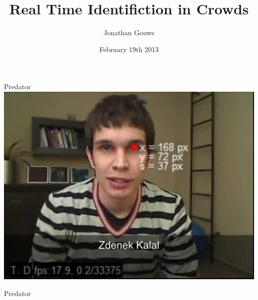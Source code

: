 \documentclass[mathserif]{beamer}
\title{Real Time Identifiction in Crowds}
\subtitle{}
\author[Gouws]{Jonathan Gouws}
\institute[RU]{Rhodes University}
\date{February 19th 2013}
\begin{document}
\begin{frame}
   \maketitle
\end{frame}

\begin{frame}{Predator\cite{PredatorVid}}
\centering
  \includegraphics[width=1.0\textwidth]{predatorcutThumb.png}
\end{frame}
\begin{frame}{Predator \cite{PredatorVid}}
\centering
\end{frame}
\end{document}
